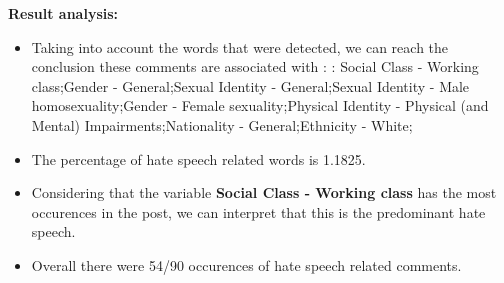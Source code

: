 \documentclass[11pt]{article}
\begin{document}
\textbf{\Large Result analysis:}

\begin{itemize}\item Taking into account the words that were detected, we can reach the conclusion these comments are associated with : : Social Class - Working class;Gender - General;Sexual Identity - General;Sexual Identity - Male homosexuality;Gender - Female sexuality;Physical Identity - Physical (and Mental) Impairments;Nationality - General;Ethnicity - White;%

\item The percentage of hate speech related words is 1.1825.

\item Considering that the variable \textbf{Social Class - Working class} has the most occurences in the post, we can interpret that this is the predominant hate speech.

\item Overall there were 54/90 occurences of hate speech related comments.\end{itemize}
\end{document}
